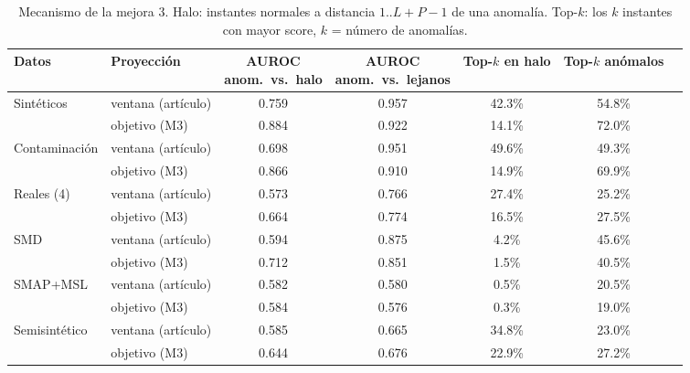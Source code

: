 \begin{table}[t]
\centering\small
\caption{Mecanismo de la mejora 3. Halo: instantes normales a distancia $1..L{+}P{-}1$ de una anomalía. Top-$k$: los $k$ instantes con mayor score, $k$ = número de anomalías.}
\label{tab:halo}
\begin{tabular}{llccccc}
\toprule
Datos & Proyección & \makecell{AUROC\\anom.\ vs.\ halo} & \makecell{AUROC\\anom.\ vs.\ lejanos} & \makecell{Top-$k$\\en halo} & \makecell{Top-$k$\\anómalos} \\
\midrule
Sintéticos & ventana (artículo) & 0.759 & 0.957 & 42.3\% & 54.8\% \\
 & objetivo (M3) & 0.884 & 0.922 & 14.1\% & 72.0\% \\
\midrule
Contaminación & ventana (artículo) & 0.698 & 0.951 & 49.6\% & 49.3\% \\
 & objetivo (M3) & 0.866 & 0.910 & 14.9\% & 69.9\% \\
\midrule
Reales (4) & ventana (artículo) & 0.573 & 0.766 & 27.4\% & 25.2\% \\
 & objetivo (M3) & 0.664 & 0.774 & 16.5\% & 27.5\% \\
\midrule
SMD & ventana (artículo) & 0.594 & 0.875 & 4.2\% & 45.6\% \\
 & objetivo (M3) & 0.712 & 0.851 & 1.5\% & 40.5\% \\
\midrule
SMAP+MSL & ventana (artículo) & 0.582 & 0.580 & 0.5\% & 20.5\% \\
 & objetivo (M3) & 0.584 & 0.576 & 0.3\% & 19.0\% \\
\midrule
Semisintético & ventana (artículo) & 0.585 & 0.665 & 34.8\% & 23.0\% \\
 & objetivo (M3) & 0.644 & 0.676 & 22.9\% & 27.2\% \\
\bottomrule
\end{tabular}
\end{table}

